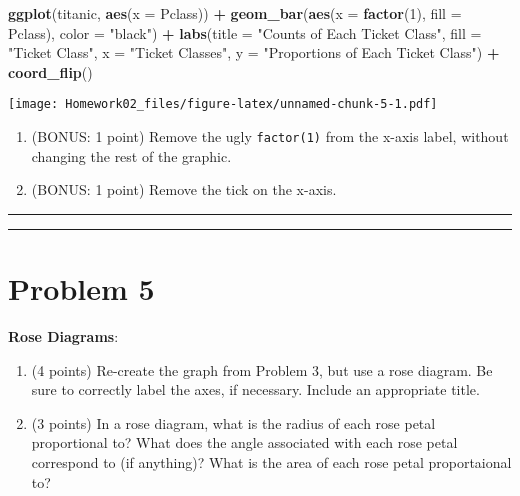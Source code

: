 \documentclass[]{article}
\newenvironment{Shaded}{\begin{snugshade}}{\end{snugshade}}
\newcommand{\DataTypeTok}[1]{\textcolor[rgb]{0.13,0.29,0.53}{#1}}
\newcommand{\DecValTok}[1]{\textcolor[rgb]{0.00,0.00,0.81}{#1}}
\newcommand{\KeywordTok}[1]{\textcolor[rgb]{0.13,0.29,0.53}{\textbf{#1}}}
\newcommand{\NormalTok}[1]{#1}
\newcommand{\OperatorTok}[1]{\textcolor[rgb]{0.81,0.36,0.00}{\textbf{#1}}}
\newcommand{\StringTok}[1]{\textcolor[rgb]{0.31,0.60,0.02}{#1}}
\begin{document}
\begin{Shaded}
\begin{Highlighting}[]
\KeywordTok{ggplot}\NormalTok{(titanic, }\KeywordTok{aes}\NormalTok{(}\DataTypeTok{x =}\NormalTok{ Pclass)) }\OperatorTok{+}
\StringTok{    }\KeywordTok{geom_bar}\NormalTok{(}\KeywordTok{aes}\NormalTok{(}\DataTypeTok{x =} \KeywordTok{factor}\NormalTok{(}\DecValTok{1}\NormalTok{), }\DataTypeTok{fill =}\NormalTok{ Pclass), }\DataTypeTok{color =} \StringTok{"black"}\NormalTok{) }\OperatorTok{+}
\StringTok{    }\KeywordTok{labs}\NormalTok{(}\DataTypeTok{title =} \StringTok{"Counts of Each Ticket Class"}\NormalTok{,}
         \DataTypeTok{fill =} \StringTok{"Ticket Class"}\NormalTok{,}
         \DataTypeTok{x =} \StringTok{"Ticket Classes"}\NormalTok{,}
         \DataTypeTok{y =} \StringTok{"Proportions of Each Ticket Class"}\NormalTok{) }\OperatorTok{+}
\StringTok{    }\KeywordTok{coord_flip}\NormalTok{()}
\end{Highlighting}
\end{Shaded}

\texttt{[image: Homework02\_files/figure-latex/unnamed-chunk-5-1.pdf]}

\begin{enumerate}
\def\labelenumi{\alph{enumi}.}
\setcounter{enumi}{3}
\item
  (BONUS: 1 point) Remove the ugly \texttt{factor(1)} from the x-axis
  label, without changing the rest of the graphic.
\item
  (BONUS: 1 point) Remove the tick on the x-axis.
\end{enumerate}

\begin{center}\rule{0.5\linewidth}{\linethickness}\end{center}

\begin{center}\rule{0.5\linewidth}{\linethickness}\end{center}

\hypertarget{problem-5}{%
\section{Problem 5}\label{problem-5}}

\textbf{Rose Diagrams}:

\begin{enumerate}
\def\labelenumi{\alph{enumi}.}
\item
  (4 points) Re-create the graph from Problem 3, but use a rose diagram.
  Be sure to correctly label the axes, if necessary. Include an
  appropriate title.
\item
  (3 points) In a rose diagram, what is the radius of each rose petal
  proportional to? What does the angle associated with each rose petal
  correspond to (if anything)? What is the area of each rose petal
  proportaional to?
\end{enumerate}
\end{document}
